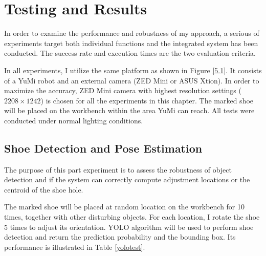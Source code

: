 \chapter{Testing and Results}

In order to examine the performance and robustness of my approach, a serious of experiments target both individual functions and the integrated system has been conducted. The success rate and execution times are the two evaluation criteria.

In all experiments, I utilize the same platform as shown in Figure \ref{5.1}. It consists of a YuMi robot and an external camera (ZED Mini or ASUS Xtion). In order to maximize the accuracy, ZED Mini camera with highest resolution settings ($2208 \times 1242$) is chosen for all the experiments in this chapter. The marked shoe will be placed on the workbench within the area YuMi can reach. All tests were conducted under normal lighting conditions. 

\section{Shoe Detection and Pose Estimation}
The purpose of this part experiment is to assess the robustness of object detection and if the system can correctly compute adjustment locations or the centroid of the shoe hole.

The marked shoe will be placed at random location on the workbench for 10 times, together with other disturbing objects. For each location, I rotate the shoe 5 times to adjust its orientation. YOLO algorithm will be used to perform shoe detection and return the prediction probability and the bounding box. Its performance is illustrated in Table \ref{yolotest}.

